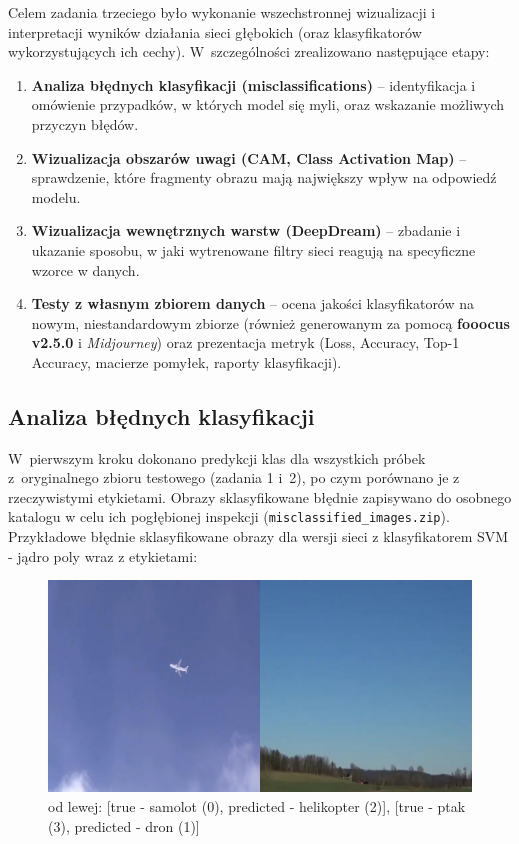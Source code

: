 
\label{sec:z3}

Celem zadania trzeciego było wykonanie wszechstronnej wizualizacji i interpretacji wyników działania sieci głębokich (oraz klasyfikatorów wykorzystujących ich cechy). W~szczególności zrealizowano następujące etapy:
\begin{enumerate}
    \item \textbf{Analiza błędnych klasyfikacji (misclassifications)} -- identyfikacja i omówienie przypadków, w których model się myli, oraz wskazanie możliwych przyczyn błędów.
    \item \textbf{Wizualizacja obszarów uwagi (CAM, Class Activation Map)} -- sprawdzenie, które fragmenty obrazu mają największy wpływ na odpowiedź modelu.
    \item \textbf{Wizualizacja wewnętrznych warstw (DeepDream)} -- zbadanie i ukazanie sposobu, w jaki wytrenowane filtry sieci reagują na specyficzne wzorce w danych.
    \item \textbf{Testy z własnym zbiorem danych} -- ocena jakości klasyfikatorów na nowym, niestandardowym zbiorze (również generowanym za pomocą \textbf{fooocus v2.5.0} i \emph{Midjourney}) oraz prezentacja metryk (Loss, Accuracy, Top-1 Accuracy, macierze pomyłek, raporty klasyfikacji).
\end{enumerate}

\subsection{Analiza błędnych klasyfikacji}
W~pierwszym kroku dokonano predykcji klas dla wszystkich próbek z~oryginalnego zbioru testowego (zadania 1 i~2), po czym porównano je z rzeczywistymi etykietami. Obrazy sklasyfikowane błędnie zapisywano do osobnego katalogu w celu ich pogłębionej inspekcji (\texttt{misclassified\_images.zip}). 
Przykładowe błędnie sklasyfikowane obrazy dla wersji sieci z klasyfikatorem SVM - jądro poly wraz z etykietami:
\begin{figure}[H]
    \centering
    \includegraphics[width=1\textwidth]{img/zad3/bledy.png}
    \caption{ od lewej: [true - samolot (0), predicted - helikopter (2)], [true - ptak (3), predicted - dron (1)]}
    \label{fig:z3_misclass}
\end{figure}

